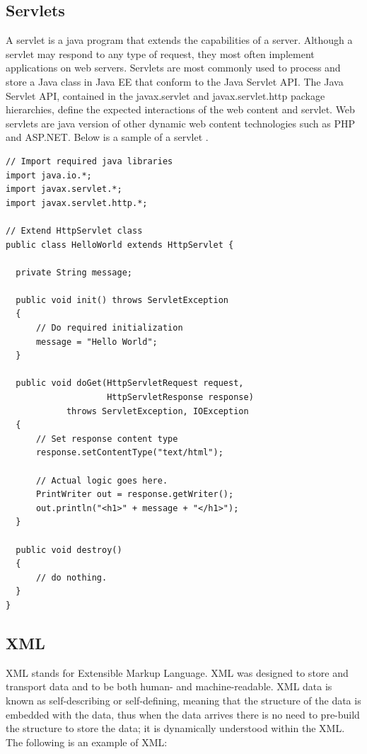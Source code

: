 \subsection{Servlets}
A servlet is a java program that extends the capabilities of a server. Although a servlet may respond to any type of request, they most often implement applications on web servers\cite{ErikJendrock}. Servlets are most commonly used to process and store a Java class in Java EE that conform to the Java Servlet API. The Java Servlet API, contained in the javax.servlet and javax.servlet.http package hierarchies,
define the expected interactions of the web content and servlet\cite{StefanZeiger}.
Web servlets are java version of other dynamic web content technologies such as PHP and ASP.NET. Below is a sample of a servlet \cite{ServletExamples}.

\begin{verbatim}
// Import required java libraries
import java.io.*;
import javax.servlet.*;
import javax.servlet.http.*;

// Extend HttpServlet class
public class HelloWorld extends HttpServlet {
 
  private String message;

  public void init() throws ServletException
  {
      // Do required initialization
      message = "Hello World";
  }

  public void doGet(HttpServletRequest request,
                    HttpServletResponse response)
            throws ServletException, IOException
  {
      // Set response content type
      response.setContentType("text/html");

      // Actual logic goes here.
      PrintWriter out = response.getWriter();
      out.println("<h1>" + message + "</h1>");
  }
  
  public void destroy()
  {
      // do nothing.
  }
}
\end{verbatim}



\subsection{XML}
XML stands for Extensible Markup Language. XML was designed to store and transport data and to be both human- and machine-readable\cite{XMLtutorial}. XML data is known as self-describing or self-defining, meaning that the structure of the data is embedded with the data, thus when the data arrives there is no need to pre-build the structure to store the data; it is dynamically understood within the XML\cite{MargaretRouse}. The following is an example of XML\cite{NormanWalsh}:

